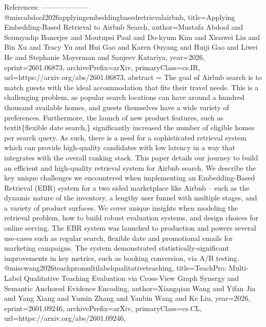         References:
        --------------------
        @misc{abdool2026applyingembeddingbasedretrievalairbnb,
      title={Applying Embedding-Based Retrieval to Airbnb Search}, 
      author={Mustafa Abdool and Soumyadip Banerjee and Moutupsi Paul and Do-kyum Kim and Xioawei Liu and Bin Xu and Tracy Yu and Hui Gao and Karen Ouyang and Huiji Gao and Liwei He and Stephanie Moyerman and Sanjeev Katariya},
      year={2026},
      eprint={2601.06873},
      archivePrefix={arXiv},
      primaryClass={cs.IR},
      url={https://arxiv.org/abs/2601.06873},
      abstract = {The goal of Airbnb search is to match guests with the ideal accommodation that fits their travel needs. This is a challenging problem, as popular search locations can have around a hundred thousand available homes, and guests themselves have a wide variety of preferences. Furthermore, the launch of new product features, such as \\textit\{flexible date search,\} significantly increased the number of eligible homes per search query. As such, there is a need for a sophisticated retrieval system which can provide high-quality candidates with low latency in a way that integrates with the overall ranking stack.   This paper details our journey to build an efficient and high-quality retrieval system for Airbnb search. We describe the key unique challenges we encountered when implementing an Embedding-Based Retrieval (EBR) system for a two sided marketplace like Airbnb -- such as the dynamic nature of the inventory, a lengthy user funnel with multiple stages, and a variety of product surfaces. We cover unique insights when modeling the retrieval problem, how to build robust evaluation systems, and design choices for online serving. The EBR system was launched to production and powers several use-cases such as regular search, flexible date and promotional emails for marketing campaigns. The system demonstrated statistically-significant improvements in key metrics, such as booking conversion, via A/B testing.}
}@misc{wang2026teachpromultilabelqualitativeteaching,
      title={TeachPro: Multi-Label Qualitative Teaching Evaluation via Cross-View Graph Synergy and Semantic Anchored Evidence Encoding}, 
      author={Xiangqian Wang and Yifan Jia and Yang Xiang and Yumin Zhang and Yanbin Wang and Ke Liu},
      year={2026},
      eprint={2601.09246},
      archivePrefix={arXiv},
      primaryClass={cs.CL},
      url={https://arxiv.org/abs/2601.09246},
}
